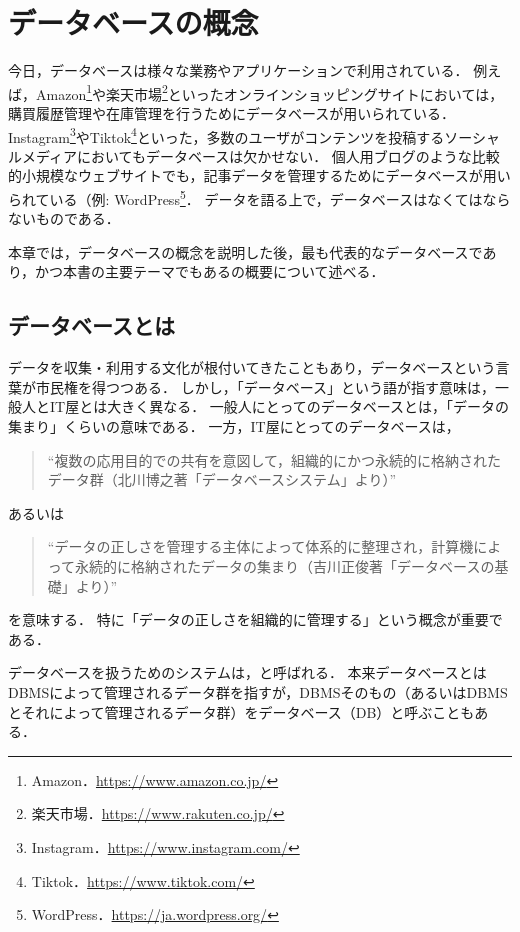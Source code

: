 \chapter{データベースの概念}
今日，データベースは様々な業務やアプリケーションで利用されている．
例えば，Amazon\footnote{Amazon．\url{https://www.amazon.co.jp/}}や楽天市場\footnote{楽天市場．\url{https://www.rakuten.co.jp/}}といったオンラインショッピングサイトにおいては，購買履歴管理や在庫管理を行うためにデータベースが用いられている．
Instagram\footnote{Instagram．\url{https://www.instagram.com/}}やTiktok\footnote{Tiktok．\url{https://www.tiktok.com/}}といった，多数のユーザがコンテンツを投稿するソーシャルメディアにおいてもデータベースは欠かせない．
個人用ブログのような比較的小規模なウェブサイトでも，記事データを管理するためにデータベースが用いられている（例: WordPress\footnote{WordPress．\url{https://ja.wordpress.org/}}．
データを語る上で，データベースはなくてはならないものである．

本章では，データベースの概念を説明した後，最も代表的なデータベースであり，かつ本書の主要テーマでもあるの概要について述べる．


\section{データベースとは}
データを収集・利用する文化が根付いてきたこともあり，データベースという言葉が市民権を得つつある．
しかし，「データベース」という語が指す意味は，一般人とIT屋とは大きく異なる．
一般人にとってのデータベースとは，「データの集まり」くらいの意味である．
一方，IT屋にとってのデータベースは，
\begin{quote}
``複数の応用目的での共有を意図して，組織的にかつ永続的に格納されたデータ群（北川博之著「データベースシステム」\cite{北川本}より）''
\end{quote}
あるいは
\begin{quote}
``データの正しさを管理する主体によって体系的に整理され，計算機によって永続的に格納されたデータの集まり（吉川正俊著「データベースの基礎」\cite{吉川本}より）''
\end{quote}
を意味する．
特に「データの正しさを組織的に管理する」という概念が重要である．

データベースを扱うためのシステムは，と呼ばれる．
本来データベースとはDBMSによって管理されるデータ群を指すが，DBMSそのもの（あるいはDBMSとそれによって管理されるデータ群）をデータベース（DB）と呼ぶこともある．

